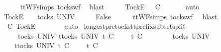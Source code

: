 \ \ \ \ \isamarkupfalse%
\ ttWF{\isachardot}simps{\isacharparenleft}{}{\isacharparenright}\ tocks{\isacharunderscore}wf\ \isamarkupfalse%
\ blast\isanewline
\ \ \isamarkupfalse%
\ \isamarkupfalse%
\ {\isachardoublequoteopen}{\isacharbrackleft}Tock{\isacharbrackright}\isactrlsub E\ {\isacharhash}\ {\isasymrho}\ {\isasymlesssim}\isactrlsub C\ {\isasymsigma}{\isacharprime}{\isacharprime}{\isachardoublequoteclose}\isanewline
\ \ \ \ \isamarkupfalse%
\ auto\isanewline
{}\isamarkupfalse%
\isanewline
\ \ \isamarkupfalse%
\ {\isasymrho}\ {\isasymsigma}{\isacharprime}{\isacharprime}\isanewline
\ \ \isamarkupfalse%
\ {\isachardoublequoteopen}{\isacharbrackleft}Tock{\isacharbrackright}\isactrlsub E\ {\isacharhash}\ {\isasymsigma}{\isacharprime}{\isacharprime}\ {\isasymin}\ tocks\ UNIV{\isachardoublequoteclose}\isanewline
\ \ \isamarkupfalse%
\ \isamarkupfalse%
\ {\isachardoublequoteopen}False{\isachardoublequoteclose}\isanewline
\ \ \ \ \isamarkupfalse%
\ ttWF{\isachardot}simps{\isacharparenleft}{}{\isacharparenright}\ tocks{\isacharunderscore}wf\ \isamarkupfalse%
\ blast\isanewline
\ \ \isamarkupfalse%
\ \isamarkupfalse%
\ {\isachardoublequoteopen}{\isasymrho}\ {\isasymlesssim}\isactrlsub C\ {\isacharbrackleft}Tock{\isacharbrackright}\isactrlsub E\ {\isacharhash}\ {\isasymsigma}{\isacharprime}{\isacharprime}{\isachardoublequoteclose}\isanewline
\ \ \ \ \isamarkupfalse%
\ auto\isanewline
{}\isamarkupfalse%
%
\endisatagproof
{\isafoldproof}%
%
\isadelimproof
\isanewline
%
\endisadelimproof
\isanewline
{}\isamarkupfalse%
\ longest{\isacharunderscore}pretocks{\isacharunderscore}tt{\isacharunderscore}prefix{\isacharunderscore}subset{\isacharunderscore}split{\isacharcolon}\isanewline
\ \ \ {\isachardoublequoteopen}{\isasymrho}\ {\isasymin}\ tocks\ UNIV{\isachardoublequoteclose}\ {\isachardoublequoteopen}{\isasymforall}t{\isasymin}tocks\ UNIV{\isachardot}\ t\ {\isasymle}\isactrlsub C\ {\isasymrho}\ {\isacharat}\ {\isasymsigma}\ {\isasymlongrightarrow}\ t\ {\isasymle}\isactrlsub C\ {\isasymrho}{\isachardoublequoteclose}\isanewline
\ \ \ {\isachardoublequoteopen}{\isasymexists}{\isasymrho}{\isacharprime}\ {\isasymsigma}{\isacharprime}{\isachardot}\ {\isasymrho}{\isacharprime}\ {\isasymin}\ tocks\ UNIV\ {\isasymand}\ \isanewline
\ \ \ \ {\isacharparenleft}{\isasymforall}t{\isasymin}tocks\ UNIV{\isachardot}\ t\ {\isasymle}\isactrlsub C\ {\isasymrho}{\isacharprime}\ {\isacharat}\ {\isasymsigma}{\isacharprime}\ {\isasymlongrightarrow}\ t\ {\isasymle}\isactrlsub C\ {\isasymrho}{\isacharprime}{\isacharparenright}\ {\isasymand}\ \isanewline
